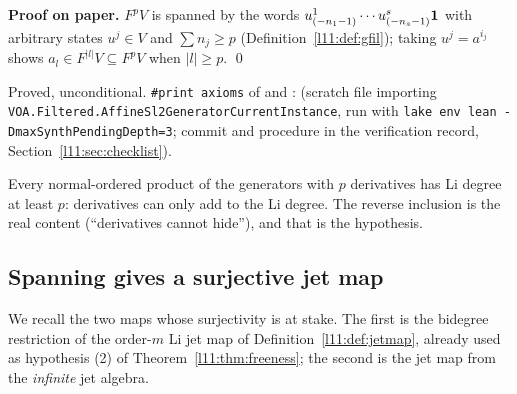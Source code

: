 \textbf{Proof on paper.} $F^pV$ is spanned by the words $u^1_{(-n_1-1)}\cdots u^s_{(-n_s-1)}\mathbf{1}$ with arbitrary
states $u^j\in V$ and $\sum n_j\ge p$ (Definition~\ref{l11:def:gfil}); taking $u^j = a^{i_j}$ shows $a_l\in F^{|l|}V\subseteq
F^pV$ when $|l|\ge p$. \qed

\begin{status}
Proved, unconditional. \texttt{\#print axioms} of \allowbreak{} and
\allowbreak{}\allowbreak{}\allowbreak{}: \lean{[propext, Classical.}\allowbreak{}\allowbreak\lean{sound]} (scratch file importing
\texttt{VOA.\allowbreak Filtered.\allowbreak AffineSl2GeneratorCurrentInstance}, run with \texttt{lake env lean -DmaxSynthPendingDepth=3};
commit and procedure in the verification record, Section~\ref{l11:sec:checklist}).
\end{status}

\begin{physics}
Every normal-ordered product of the generators with $p$ derivatives has Li degree at least $p$: derivatives can only
add to the Li degree. The reverse inclusion is the real content (``derivatives cannot hide''), and that is the
hypothesis.
\end{physics}

\subsection{Spanning gives a surjective jet map}\label{l11:sec:genwords-surj}

We recall the two maps whose surjectivity is at stake. The first is the bidegree restriction of the order-$m$ Li jet
map of Definition~\ref{l11:def:jetmap}, already used as hypothesis (2) of Theorem~\ref{l11:thm:freeness}; the second
is the jet map from the \emph{infinite} jet algebra.

